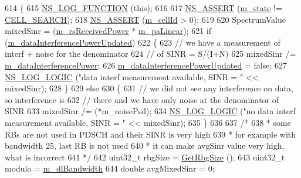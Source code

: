 \begin{DoxyCode}
614 \{
615   \hyperlink{log-macros-disabled_8h_a90b90d5bad1f39cb1b64923ea94c0761}{NS\_LOG\_FUNCTION} (\textcolor{keyword}{this});
616 
617   \hyperlink{assert_8h_a6dccdb0de9b252f60088ce281c49d052}{NS\_ASSERT} (\hyperlink{classns3_1_1LteUePhy_a5a8bad2a7221da5f87727d53d58b481f}{m\_state} != \hyperlink{classns3_1_1LteUePhy_ae5118801f100c494663f0ca1e942aa31a5da02705337a130a4e573ae825e8ef70}{CELL\_SEARCH});
618   \hyperlink{assert_8h_a6dccdb0de9b252f60088ce281c49d052}{NS\_ASSERT} (\hyperlink{classns3_1_1LtePhy_ac53d10d27f1bde64807a3ff366662787}{m\_cellId} > 0);
619   
620   SpectrumValue mixedSinr = (\hyperlink{classns3_1_1LteUePhy_a6ed253b11e81be61b177836490e4d07b}{m\_rsReceivedPower} * \hyperlink{classns3_1_1LteUePhy_ac0fbcaa87d4b06827890924c0189d9e6}{m\_paLinear});
621   \textcolor{keywordflow}{if} (\hyperlink{classns3_1_1LteUePhy_ae176dc7063316f7806143506e4f14506}{m\_dataInterferencePowerUpdated})
622     \{
623       \textcolor{comment}{// we have a measurement of interf + noise for the denominator}
624       \textcolor{comment}{// of SINR = S/(I+N)}
625       mixedSinr /= \hyperlink{classns3_1_1LteUePhy_a07392a887af77cad0363fb50b9bc4b1e}{m\_dataInterferencePower};
626       \hyperlink{classns3_1_1LteUePhy_ae176dc7063316f7806143506e4f14506}{m\_dataInterferencePowerUpdated} = \textcolor{keyword}{false};
627       \hyperlink{group__logging_ga88acd260151caf2db9c0fc84997f45ce}{NS\_LOG\_LOGIC} (\textcolor{stringliteral}{"data interf measurement available, SINR = "} << mixedSinr);
628     \}
629   \textcolor{keywordflow}{else}
630     \{
631       \textcolor{comment}{// we did not see any interference on data, so interference is}
632       \textcolor{comment}{// there and we have only noise at the denominator of SINR}
633       mixedSinr /= (*m\_noisePsd);
634       \hyperlink{group__logging_ga88acd260151caf2db9c0fc84997f45ce}{NS\_LOG\_LOGIC} (\textcolor{stringliteral}{"no data interf measurement available, SINR = "} << mixedSinr);
635     \}
636 
637   \textcolor{comment}{/*}
638 \textcolor{comment}{   * some RBs are not used in PDSCH and their SINR is very high}
639 \textcolor{comment}{   * for example with bandwidth 25, last RB is not used}
640 \textcolor{comment}{   * it can make avgSinr value very high, what is incorrect}
641 \textcolor{comment}{   */}
642   uint32\_t rbgSize = \hyperlink{classns3_1_1LtePhy_a0b43cc13670b730fce0b55c8e0db60d9}{GetRbgSize} ();
643   uint32\_t modulo = \hyperlink{classns3_1_1LtePhy_a566aee423c957f3b7ab7f8f7eacc7eb3}{m\_dlBandwidth} %
644   \textcolor{keywordtype}{double} avgMixedSinr = 0;

\end{DoxyCode}
